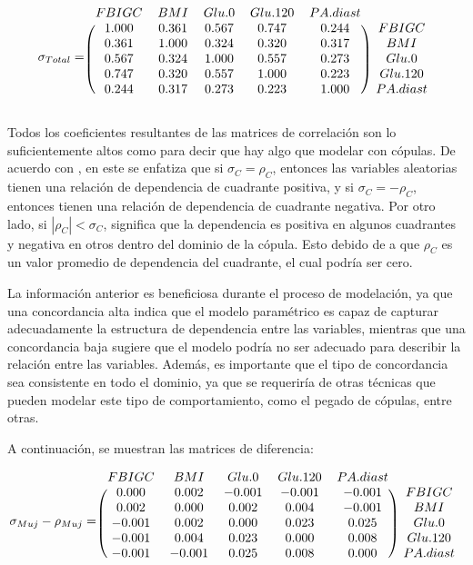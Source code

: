 \[
\sigma_{Total} = \begin{blockarray}{cccccc}
FBIGC      &      BMI      &    Glu.0      &  Glu.120      & PA.diast \\
\begin{block}{(ccccc)c}
1.000 & 0.361 & 0.567 & 0.747 & 0.244 & FBIGC \\
0.361 & 1.000 & 0.324 & 0.320 & 0.317 & BMI \\
0.567 & 0.324 & 1.000 & 0.557 & 0.273 & Glu.0 \\
0.747 & 0.320 & 0.557 & 1.000 & 0.223 & Glu.120 \\
0.244 & 0.317 & 0.273 & 0.223 & 1.000 & PA.diast \\
\end{block}
\end{blockarray}
 \]

Todos los coeficientes resultantes de las matrices de correlación son lo suficientemente altos como para decir que hay algo que modelar con cópulas. De acuerdo con \cite{Erdely2022}, en este se enfatiza que si $\sigma_{C} = \rho_{C}$, entonces las variables aleatorias tienen una relación de dependencia de cuadrante positiva, y si $\sigma_{C} = -\rho_{C}$, entonces tienen una relación de dependencia de cuadrante negativa. Por otro lado, si $ |\rho_C| < \sigma_C$, significa que la dependencia es positiva en algunos cuadrantes y negativa en otros dentro del dominio de la cópula. Esto debido de a que $\rho_{C}$ es un valor promedio de dependencia del cuadrante, el cual podría ser cero.


La información anterior es beneficiosa durante el proceso de modelación, ya que una concordancia alta indica que el modelo paramétrico es capaz de capturar adecuadamente la estructura de dependencia entre las variables, mientras que una concordancia baja sugiere que el modelo podría no ser adecuado para describir la relación entre las variables. Además, es importante que el tipo de concordancia sea consistente en todo el dominio, ya que se requeriría de otras técnicas que pueden modelar este tipo de comportamiento, como el pegado de cópulas, entre otras.

A continuación, se muestran las matrices de diferencia:


\[
\sigma_{Muj} - \rho_{Muj} = \begin{blockarray}{cccccc}
FBIGC      &      BMI      &    Glu.0      &  Glu.120      & PA.diast \\
\begin{block}{(ccccc)c}
  0.000 & 0.002 & -0.001 & -0.001  & -0.001 & FBIGC \\
  0.002 & 0.000 &  0.002 &  0.004  & -0.001 & BMI \\
 -0.001 & 0.002 &  0.000 &  0.023  &  0.025 & Glu.0 \\
 -0.001 & 0.004 &  0.023 &  0.000  &  0.008 & Glu.120 \\
 -0.001 &-0.001 &  0.025 &  0.008  &  0.000 & PA.diast \\
\end{block}
\end{blockarray}
 \]

